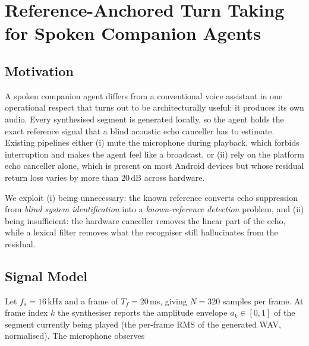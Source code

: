%
%   

\section{Reference-Anchored Turn Taking for Spoken Companion Agents}
\label{sec:ratt}

\subsection{Motivation}

A spoken companion agent differs from a conventional voice assistant in one
operational respect that turns out to be architecturally useful: it produces
its own audio. Every synthesised segment is generated locally, so the agent
holds the exact reference signal that a blind acoustic echo canceller has to
estimate. Existing pipelines either (i) mute the microphone during playback,
which forbids interruption and makes the agent feel like a broadcast, or
(ii) rely on the platform echo canceller alone, which is present on most
Android devices but whose residual return loss varies by more than 20\,dB
across hardware.

We exploit (i) being unnecessary: the known reference converts echo
suppression from \emph{blind system identification} into a
\emph{known-reference detection} problem, and (ii) being insufficient: the
hardware canceller removes the linear part of the echo, while a lexical filter
removes what the recogniser still hallucinates from the residual.

\subsection{Signal Model}

Let $f_s = 16$\,kHz and a frame of $T_f = 20$\,ms, giving $N = 320$ samples per
frame. At frame index $k$ the synthesiser reports the amplitude envelope
$a_k \in [0,1]$ of the segment currently being played (the per-frame RMS of the
generated WAV, normalised). The microphone observes

